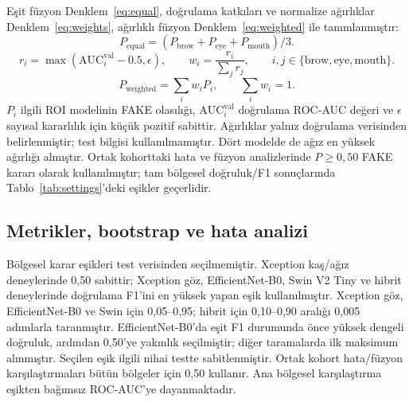 \documentclass[a4paper]{elektr}
\begin{document}
Eşit füzyon Denklem~\eqref{eq:equal}, doğrulama katkıları ve normalize ağırlıklar Denklem~\eqref{eq:weights}, ağırlıklı füzyon Denklem~\eqref{eq:weighted} ile tanımlanmıştır:
\begin{equation}\label{eq:equal}
P_{\mathrm{equal}}=(P_{\mathrm{brow}}+P_{\mathrm{eye}}+P_{\mathrm{mouth}})/3.
\end{equation}
\begin{equation}\label{eq:weights}
r_i=\max(\mathrm{AUC}^{\mathrm{val}}_i-0.5,\epsilon),\qquad
w_i=\frac{r_i}{\sum_jr_j},\qquad i,j\in\{\mathrm{brow,eye,mouth}\}.
\end{equation}
\begin{equation}\label{eq:weighted}
P_{\mathrm{weighted}}=\sum_iw_iP_i,\qquad\sum_iw_i=1.
\end{equation}
$P_i$ ilgili ROI modelinin FAKE olasılığı, $\mathrm{AUC}^{\mathrm{val}}_i$ doğrulama ROC-AUC değeri ve $\epsilon$ sayısal kararlılık için küçük pozitif sabittir. Ağırlıklar yalnız doğrulama verisinden belirlenmiştir; test bilgisi kullanılmamıştır. Dört modelde de ağız en yüksek ağırlığı almıştır. Ortak kohorttaki hata ve füzyon analizlerinde $P\geq0{,}50$ FAKE kararı olarak kullanılmıştır; tam bölgesel doğruluk/F1 sonuçlarında Tablo~\ref{tab:settings}’deki eşikler geçerlidir.

\subsection{Metrikler, bootstrap ve hata analizi}
Bölgesel karar eşikleri test verisinden seçilmemiştir. Xception kaş/ağız deneylerinde 0,50 sabittir; Xception göz, EfficientNet-B0, Swin V2 Tiny ve hibrit deneylerinde doğrulama F1’ini en yüksek yapan eşik kullanılmıştır. Xception göz, EfficientNet-B0 ve Swin için 0,05--0,95; hibrit için 0,10--0,90 aralığı 0,005 adımlarla taranmıştır. EfficientNet-B0’da eşit F1 durumunda önce yüksek dengeli doğruluk, ardından 0,50’ye yakınlık seçilmiştir; diğer taramalarda ilk maksimum alınmıştır. Seçilen eşik ilgili nihai testte sabitlenmiştir. Ortak kohort hata/füzyon karşılaştırmaları bütün bölgeler için 0,50 kullanır. Ana bölgesel karşılaştırma eşikten bağımsız ROC-AUC’ye dayanmaktadır.
\end{document}
